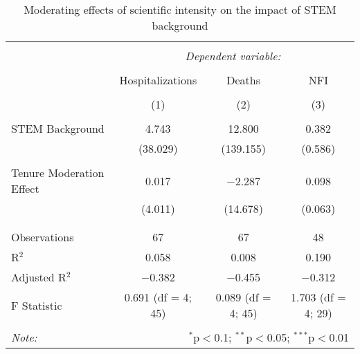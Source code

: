 
\begin{table}[!htbp] \centering 
  \caption{Moderating effects of scientific intensity on the impact of STEM background} 
  \label{} 
\begin{tabular}{@{\extracolsep{5pt}}lccc} 
\\[-1.8ex]\hline 
\hline \\[-1.8ex] 
 & \multicolumn{3}{c}{\textit{Dependent variable:}} \\ 
\cline{2-4} 
\\[-1.8ex] & Hospitalizations & Deaths & NFI \\ 
\\[-1.8ex] & (1) & (2) & (3)\\ 
\hline \\[-1.8ex] 
 STEM Background & 4.743 & 12.800 & 0.382 \\ 
  & (38.029) & (139.155) & (0.586) \\ 
  & & & \\ 
 Tenure Moderation Effect & 0.017 & $-$2.287 & 0.098 \\ 
  & (4.011) & (14.678) & (0.063) \\ 
  & & & \\ 
\hline \\[-1.8ex] 
Observations & 67 & 67 & 48 \\ 
R$^{2}$ & 0.058 & 0.008 & 0.190 \\ 
Adjusted R$^{2}$ & $-$0.382 & $-$0.455 & $-$0.312 \\ 
F Statistic & 0.691 (df = 4; 45) & 0.089 (df = 4; 45) & 1.703 (df = 4; 29) \\ 
\hline 
\hline \\[-1.8ex] 
\textit{Note:}  & \multicolumn{3}{r}{$^{*}$p$<$0.1; $^{**}$p$<$0.05; $^{***}$p$<$0.01} \\ 
\end{tabular} 
\end{table} 
